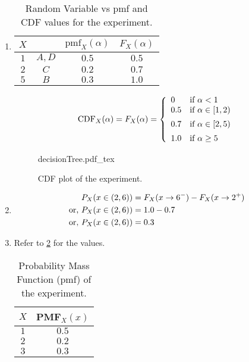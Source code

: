 \begin{enumerate}[6a.]
	\item 
		\begin{table}[H]
			\centering
			\caption{Random Variable vs pmf and CDF values for the experiment.}
			\label{tab:pmf6a1}
			\begin{tabular}{cccc}
				\toprule
				$X$ & \text{outcomes} & $\text{pmf}_X(\alpha)$ & $F_X(\alpha)$\\
				\midrule
				$1$ & $A, D$  & $0.5$ & $0.5$ \\
				$2$ & $C$     & $0.2$ & $0.7$ \\
				$5$ & $B$     & $0.3$ & $1.0$ \\
				\bottomrule
			\end{tabular}
		\end{table}
	
		\begin{equation}
			\text{CDF}_X(\alpha) = F_X(\alpha) = \fourpartdef{0}{\alpha<1}{0.5}{\alpha \in [1,2)}{0.7}{\alpha \in [2,5)}{1.0}{\alpha \geq 5} \nonumber
		\end{equation}
		
		\begin{figure}[H]
			\centering
			\begin{adjustbox}{max width=0.3\textwidth}
				{decisionTree.pdf_tex}
			\end{adjustbox}
			\caption{CDF plot of the experiment.}
			\label{fig:cdf6a1}
		\end{figure}
	
	\item 
		\begin{align}
			P_X(x \in (2,6)) &= F_X(x \rightarrow 6^-) - F_X(x \rightarrow 2^+) \nonumber\\
			\text{or, } P_X(x \in (2,6)) &= 1.0 - 0.7 \nonumber\\
			\text{or, } P_X(x \in (2,6)) &= 0.3 \nonumber
		\end{align}
	
	\item Refer to \cref{tab:pmf6c1} for the values.
		\begin{table}[H]
			\centering
			\caption{Probability Mass Function (pmf) of the experiment.}
			\label{tab:pmf6c1}
			\begin{tabular}{cc}
				\toprule
				$X$ & PMF$_X(x)$ \\
				\midrule
				$1$ & $0.5$ \\
				$2$ & $0.2$ \\
				$3$ & $0.3$ \\
				\bottomrule
			\end{tabular}
		\end{table}
	

\end{enumerate}
